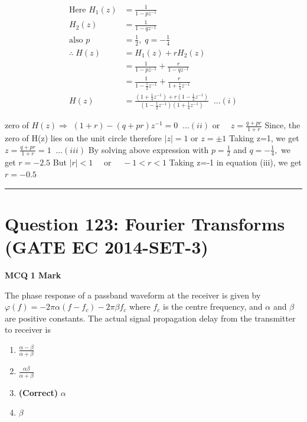 \documentclass[11pt,a4paper]{article}
\begin{document}
\begin{tcolorbox}[solbox, title=Detailed Solution -- Question 122]
\[
\begin{aligned} \text{Here } H_1(z)&=\frac{1}{1-pz^{-1}} \\ H_2(z)&= \frac{1}{1-qz^{-1}}\\ \text{also } p&=\frac{1}{2},\; q=-\frac{1}{4} \\ \therefore \; H(z)&=H_1(z)+rH_2(z) \\ &= \frac{1}{1-pz^{-1}}+\frac{r}{1-qz^{-1}}\\ &= \frac{1}{1-\frac{1}{2}z^{-1}}+\frac{r}{1+\frac{1}{4}z^{-1}}\\ H(z)&=\frac{\left ( 1+\frac{1}{4}z^{-1} \right )+r\left ( 1-\frac{1}{2}z^{-1} \right )}{\left ( 1-\frac{1}{2}z^{-1} \right )\left ( 1+\frac{1}{4}z^{-1} \right )}\;\;...(i) \end{aligned}
\]

zero of $H(z) \Rightarrow$
$(1+r)-(q+p r) z^{-1}=0 \; \; ...(ii)$
 or $\quad z=\frac{q+p r}{1+r}$
 Since, the zero of H(z) lies on the unit circle 
 therefore $|z|=1$ or $z=\pm 1$
 Taking z=1, we get 
$z=\frac{q+p r}{1+r}=1 \; \; ...(iii)$
 By solving above expression with $p=\frac{1}{2}$ and $q=-\frac{1}{4},$ we get
$r=-2.5$
 But $|r| < 1 \quad$ or $\quad-1 < r < 1$
 Taking z=-1 in equation (iii), we get
$r=-0.5$
\end{tcolorbox}

\vspace{1.5em}
\hrule
\vspace{1.5em}

\section*{Question 123: Fourier Transforms (GATE EC 2014-SET-3)}
\noindent \textbf{\color{primary}MCQ} \hfill \textbf{\color{secondary}1 Mark}


\noindent The phase response of a passband waveform at the receiver is given by 
 $\varphi (f)=-2\pi \alpha (f-f_{c})-2\pi \beta f_{c}$
 where $f_{c}$ 
 is the centre frequency, and $\alpha$ and $\beta$ are positive constants. The actual signal propagation delay from the transmitter to receiver is


\begin{enumerate}[label=(\Alph*)]
    \item $\frac{\alpha - \beta}{\alpha +\beta }$
    \item $\frac{\alpha  \beta}{\alpha +\beta }$
    \item \textbf{(Correct)} $\alpha$
    \item $\beta$
\end{enumerate}
\end{document}
